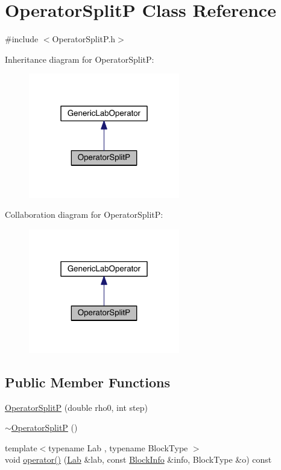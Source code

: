 \hypertarget{class_operator_split_p}{}\section{Operator\+Split\+P Class Reference}
\label{class_operator_split_p}


{\ttfamily \#include $<$Operator\+Split\+P.\+h$>$}



Inheritance diagram for Operator\+Split\+P\+:\nopagebreak
\begin{figure}[H]
\begin{center}
\leavevmode
\includegraphics[width=187pt]{d7/d15/class_operator_split_p__inherit__graph}
\end{center}
\end{figure}


Collaboration diagram for Operator\+Split\+P\+:\nopagebreak
\begin{figure}[H]
\begin{center}
\leavevmode
\includegraphics[width=187pt]{da/d49/class_operator_split_p__coll__graph}
\end{center}
\end{figure}
\subsection*{Public Member Functions}
\begin{DoxyCompactItemize}
\item 
\hyperlink{class_operator_split_p_a6e98b9ffa8fc8b723d165bd8875f4e71}{Operator\+Split\+P} (double rho0, int step)
\item 
\hyperlink{class_operator_split_p_a88289827938a12556d02544d6f2ee1f5}{$\sim$\+Operator\+Split\+P} ()
\item 
{\footnotesize template$<$typename Lab , typename Block\+Type $>$ }\\void \hyperlink{class_operator_split_p_abd37608f5d445bfaf06c9b1f2a31fabf}{operator()} (\hyperlink{_definitions_8h_ad6f951af9a2a6ebc1975404882b34314}{Lab} \&lab, const \hyperlink{struct_block_info}{Block\+Info} \&info, Block\+Type \&o) const 
\end{DoxyCompactItemize}
